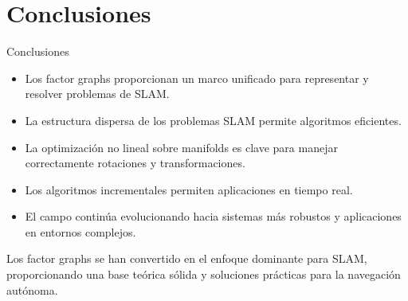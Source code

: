 \documentclass[10pt]{beamer}
\begin{document}
        \section{Conclusiones}
        \begin{frame}{Conclusiones}
            \begin{itemize}
                \item Los factor graphs proporcionan un marco unificado para representar y resolver problemas de SLAM.
                
                \item La estructura dispersa de los problemas SLAM permite algoritmos eficientes.
                
                \item La optimización no lineal sobre manifolds es clave para manejar correctamente rotaciones y transformaciones.
                
                \item Los algoritmos incrementales permiten aplicaciones en tiempo real.
                
                \item El campo continúa evolucionando hacia sistemas más robustos y aplicaciones en entornos complejos.
            \end{itemize}
            
            Los factor graphs se han convertido en el enfoque dominante para SLAM, proporcionando una base teórica sólida y soluciones prácticas para la navegación autónoma.
        \end{frame}
\end{document}
